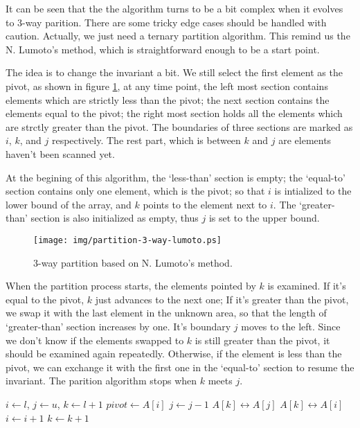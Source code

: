 \documentclass{article}
\begin{document}
It can be seen that the the algorithm turns to be a bit complex when it evolves to 3-way parition.
There are some tricky edge cases should be handled with caution. Actually, we just need a ternary
partition algorithm. This remind us the N. Lumoto's method, which is straightforward enough
to be a start point.

The idea is to change the invariant a bit. We still select the first element as the pivot, 
as shown in figure \ref{fig:partition-3-way-lumoto},
at any time point, the left most section contains elements which are strictly less than the pivot;
the next section contains the elements equal to the pivot; the right most section holds all the
elements which are strctly greater than the pivot. The boundaries of three sections are marked
as $i$, $k$, and $j$ respectively.
The rest part, which is between $k$ and $j$ are elements haven't been scanned yet.

At the begining of this algorithm, the `less-than' section is empty; the `equal-to' section
contains only one element, which is the pivot; so that $i$ is intialized to the lower bound
of the array, and $k$ points to the element next to $i$. The `greater-than' section is also
initialized as empty, thus $j$ is set to the upper bound.

\begin{figure}[htbp]
   \centering
   \texttt{[image: img/partition-3-way-lumoto.ps]}
   \caption{3-way partition based on N. Lumoto's method.} 
   \label{fig:partition-3-way-lumoto}
\end{figure}

When the partition process starts, the elements pointed by $k$ is examined. If it's equal to
the pivot, $k$ just advances to the next one; If it's greater than the pivot, we swap it with
the last element in the unknown area, so that the length of `greater-than' section increases
by one. It's boundary $j$ moves to the left. Since we don't know if the elements swapped to $k$
is still greater than the pivot, it should be examined again repeatedly. Otherwise, if the
element is less than the pivot, we can exchange it with the first one in the `equal-to' section
to resume the invariant. The parition algorithm stops when $k$ meets $j$.

\begin{algorithmic}
    \State $i \gets l$, $j \gets u$, $k \gets l + 1$
    \State $pivot \gets A[i]$
        \State $j \gets j - 1$
        \State {} $A[k] \leftrightarrow A[j]$
      \EndWhile
        \State {} $A[k] \leftrightarrow A[i]$
        \State $i \gets i + 1$
      \EndIf
      \State $k \gets k + 1$
    \EndWhile
    \State {}
    \State {}
  \EndIf
\EndProcedure
\end{algorithmic}
\end{document}
